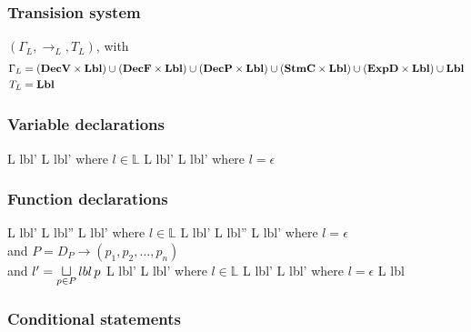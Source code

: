 \subsubsection{Transision system}
$(\Gamma_{L}, \rightarrow_{L}, T_{L})$, with
\begin{align*}
  \Gamma_{L} & = (\mathbf{DecV} \times \mathbf{Lbl}) \cup (\mathbf{DecF} \times \mathbf{Lbl}) \cup (\mathbf{DecP} \times \mathbf{Lbl}) \cup (\mathbf{StmC} \times \mathbf{Lbl}) \cup (\mathbf{ExpD} \times \mathbf{Lbl}) \cup \mathbf{Lbl} \\
  T_{L} & = \mathbf{Lbl}
\end{align*}

\subsubsection{Variable declarations}

      { {L} {lbl'} }
      { {L} {lbl'} }
      {where $l \in \mathbb{L}$}
      { {L} {lbl'} }
      { {L} {lbl'} }
      {where $l = \epsilon$}

\subsubsection{Function declarations}

      { {L} {lbl'} }
      { {L} {lbl''} \;\;  {L} {lbl'} }
      {where $l \in \mathbb{L}$}
      { {L} {lbl'} }
      { {L} {lbl''} \;  {L} {lbl'} }
      {where $l = \epsilon$\\
      and $P = D_P \rightarrow (p_1, p_2, \dots, p_n)$\\
      and $l' = \sqcupl\limits_{p \in P} lbl \, p$}
      { {L} {lbl'} }
      { {L} {lbl'} }
      {where $l \in \mathbb{L}$}
      { {L} {lbl'} }
      { {L} {lbl'} }
      {where $l = \epsilon$}
      { {L} {lbl} }
      {}
      {}

\subsubsection{Conditional statements}

